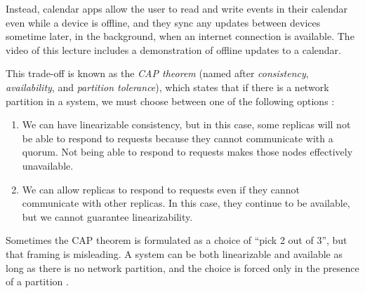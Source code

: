 \begin{frame}[plain]
    \label{s:calendar}
\end{frame}
\label{l:calendar}

Instead, calendar apps allow the user to read and write events in their calendar even while a device is offline, and they sync any updates between devices sometime later, in the background, when an internet connection is available.
The video of this lecture includes a demonstration of offline updates to a calendar.

This trade-off is known as the \emph{CAP theorem} (named after \emph{consistency}, \emph{availability}, and \emph{partition tolerance}), which states that if there is a network partition in a system, we must choose between one of the following options \citep{Gilbert:2002}:
\begin{enumerate}
    \item We can have linearizable consistency, but in this case, some replicas will not be able to respond to requests because they cannot communicate with a quorum.
        Not being able to respond to requests makes those nodes effectively unavailable.
    \item We can allow replicas to respond to requests even if they cannot communicate with other replicas.
        In this case, they continue to be available, but we cannot guarantee linearizability.
\end{enumerate}
Sometimes the CAP theorem is formulated as a choice of ``pick 2 out of 3'', but that framing is misleading.
A system can be both linearizable and available as long as there is no network partition, and the choice is forced only in the presence of a partition \citep{Kleppmann:2015}.


